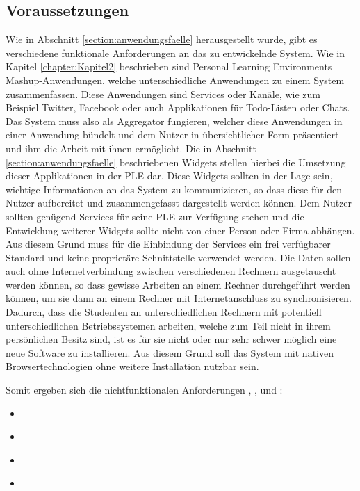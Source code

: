 \subsection{Voraussetzungen}
Wie in Abschnitt \ref{section:anwendungsfaelle} herausgestellt wurde, gibt es verschiedene funktionale Anforderungen an das zu entwickelnde System. Wie in Kapitel \ref{chapter:Kapitel2} beschrieben sind Personal Learning Environments Mashup-Anwendungen, welche unterschiedliche Anwendungen zu einem System zusammenfassen. Diese Anwendungen sind Services oder Kanäle, wie zum Beispiel Twitter, Facebook oder auch Applikationen für Todo-Listen oder Chats. Das System muss also als Aggregator fungieren, welcher diese Anwendungen in einer Anwendung bündelt und dem Nutzer in übersichtlicher Form präsentiert und ihm die Arbeit mit ihnen ermöglicht. Die in Abschnitt \ref{section:anwendungsfaelle} beschriebenen Widgets stellen hierbei die Umsetzung dieser Applikationen in der PLE dar. Diese Widgets sollten in der Lage sein, wichtige Informationen an das System zu kommunizieren, so dass diese für den Nutzer aufbereitet und zusammengefasst dargestellt werden können. Dem Nutzer sollten genügend Services für seine PLE zur Verfügung stehen und die Entwicklung weiterer Widgets sollte nicht von einer Person oder Firma abhängen. Aus diesem Grund muss für die Einbindung der Services ein frei verfügbarer Standard und keine proprietäre Schnittstelle verwendet werden. Die Daten sollen auch ohne Internetverbindung zwischen verschiedenen Rechnern ausgetauscht werden können, so dass gewisse Arbeiten an einem Rechner durchgeführt werden können, um sie dann an einem Rechner mit Internetanschluss zu synchronisieren. Dadurch, dass die Studenten an unterschiedlichen Rechnern mit potentiell unterschiedlichen Betriebssystemen arbeiten, welche zum Teil nicht in ihrem persönlichen Besitz sind, ist es für sie nicht oder nur sehr schwer möglich eine neue Software zu installieren. Aus diesem Grund soll das System mit nativen Browsertechnologien ohne weitere Installation nutzbar sein.

Somit ergeben sich die nichtfunktionalen Anforderungen , ,  und : 
\begin{itemize}
 \item \requirementnf{\requirementAggregator}\label{requirementAggregator}
 \item \requirementnf{\requirementWidgetStandard}\label{requirementWidgetStandard}
 \item \requirementnf{\requirementUsbStick}\label{requirementUsbStick}
 \item \requirementnf{\requirementUsageInBrowser}\label{requirementUsageInBrowser}
\end{itemize}

